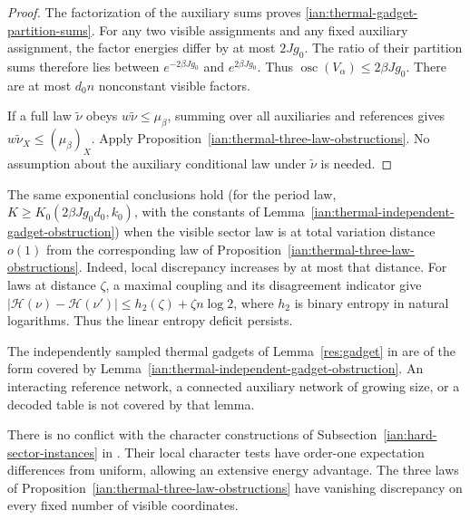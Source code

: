 \begin{proof}
The factorization of the auxiliary sums proves
\eqref{ian:thermal-gadget-partition-sums}.
For any two visible assignments and any fixed auxiliary assignment,
the factor energies differ by at most \(2Jg_0\).
The ratio of their partition sums therefore lies between
\(e^{-2\beta Jg_0}\) and \(e^{2\beta Jg_0}\).
Thus \(\operatorname{osc}(V_\alpha)\le2\beta Jg_0\).
There are at most \(d_0n\) nonconstant visible factors.

If a full law \(\widetilde\nu\) obeys
\(w\widetilde\nu\le\mu_\beta\), summing over all auxiliaries and
references gives \(w\widetilde\nu_X\le(\mu_\beta)_X\).
Apply Proposition~\ref{ian:thermal-three-law-obstructions}.
No assumption about the auxiliary conditional law under
\(\widetilde\nu\) is needed.
\end{proof}

\begin{remark}
\label{ian:thermal-gadget-scope}
The same exponential conclusions hold (for the period law,
\(K\ge K_0(2\beta Jg_0d_0,k_0)\), with the constants of
Lemma~\ref{ian:thermal-independent-gadget-obstruction}) when the
visible sector law is
at total variation distance \(o(1)\) from the corresponding law of
Proposition~\ref{ian:thermal-three-law-obstructions}. Indeed, local
discrepancy increases by at most that distance.
For laws at distance \(\zeta\), a maximal coupling and its disagreement
indicator give
\(|\mathcal H(\nu)-\mathcal H(\nu')|
\le h_2(\zeta)+\zeta n\log2\), where \(h_2\) is binary entropy in
natural logarithms. Thus the linear entropy deficit persists.

The independently sampled thermal gadgets of Lemma~\ref{res:gadget} in
 are of the
form covered by Lemma~\ref{ian:thermal-independent-gadget-obstruction}.
An interacting reference network, a connected auxiliary network of
growing size, or a decoded table is not covered by that lemma.

There is no conflict with the character constructions of
Subsection~\ref{ian:hard-sector-instances} in
. Their local character tests
have order-one expectation differences from uniform, allowing an
extensive energy advantage. The three laws of
Proposition~\ref{ian:thermal-three-law-obstructions} have
vanishing discrepancy on every fixed number of visible coordinates.
\end{remark}

